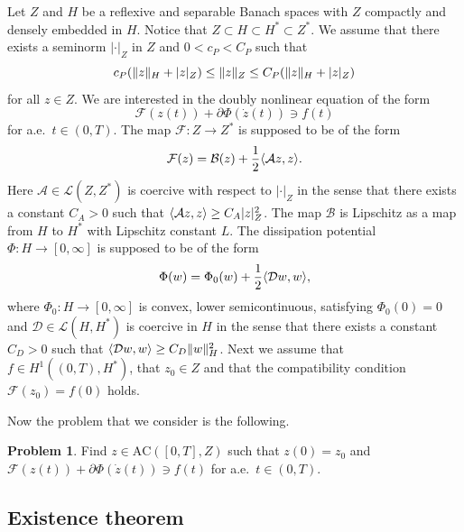 \documentclass[a4paper,10pt,twoside]{amsbook}
\numberwithin{section}{chapter}
\numberwithin{equation}{chapter}
\theoremstyle{definition}
\newtheorem{prb}[prop]{Problem}
\DeclarePairedDelimiter{\norm}{\lVert}{\rVert}
\DeclarePairedDelimiter{\dual}{\langle}{\rangle}
\begin{document}
Let $Z$ and $H$ be a reflexive and separable Banach spaces with $Z$ compactly and densely embedded in $H$. Notice that $Z\subset H\subset H^*\subset Z^*$. We assume that there exists a seminorm $|\cdot|_Z$ in $Z$ and $0<c_P<C_P$ such that
\[
c_P(\norm{z}_H+|z|_Z)\le\norm{z}_Z\le C_P(\norm{z}_H+|z|_Z)
\]
for all $z\in Z$. We are interested in the doubly nonlinear equation of the form
\[
\mathcal{F}(z(t))+\partial\Phi(\dot z(t))\ni f(t)
\]
for a.e.\ $t\in(0,T)$. The map $\mathcal{F}\colon Z\to Z^*$ is supposed to be of the form
\[
\mathcal{F}(z)=\mathcal{B}(z)+\frac{1}{2}\dual{\mathcal{A}z,z}.
\]
Here $\mathcal{A}\in\mathscr{L}(Z,Z^*)$ is coercive with respect to $|\cdot|_Z$ in the sense that there exists a constant $C_A>0$ such that $\dual{\mathcal{A}z,z}\ge C_A|z|_Z^2$. The map $\mathcal{B}$ is Lipschitz as a map from $H$ to $H^*$ with Lipschitz constant $L$. The dissipation potential $\Phi\colon H\to[0,\infty]$ is supposed to be of the form
\[
\Phi(w)=\Phi_0(w)+\frac{1}{2}\dual{\mathcal{D}w,w},
\]
where $\Phi_0\colon H\to[0,\infty]$ is convex, lower semicontinuous, satisfying $\Phi_0(0)=0$ and $\mathcal{D}\in\mathscr{L}(H,H^*)$ is coercive in $H$ in the sense that there exists a constant $C_D>0$ such that $\dual{\mathcal{D}w,w}\ge C_D\norm{w}_H^2$. Next we assume that $f\in H^1((0,T),H^*)$, that $z_0\in Z$ and that the compatibility condition $\mathcal{F}(z_0)=f(0)$ holds.

Now the problem that we consider is the following.
\begin{prb}
\label{prb:roubickeck}
Find $z\in\text{AC}([0,T],Z)$ such that $z(0)=z_0$ and $\mathcal{F}(z(t))+\partial\Phi(\dot z(t))\ni f(t)$ for a.e.\ $t\in(0,T)$.
\end{prb}

\subsection{Existence theorem}
\end{document}
